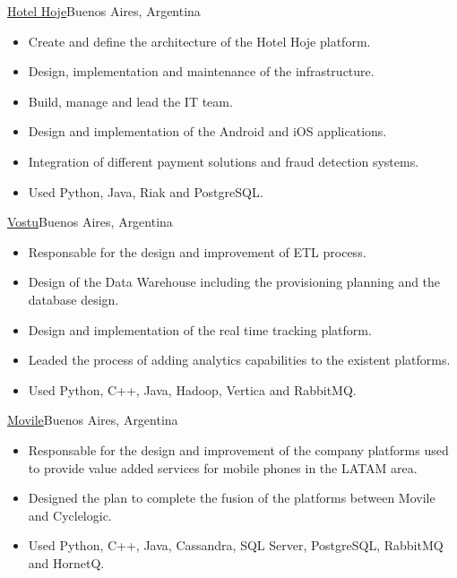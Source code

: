 \documentclass[a4paper,11pt]{moderncv}
\newcommand\weblink[2] {{\color{href} \href{#1}{#2}}}
\begin{document}
%
{\weblink{http://www.hotelhoje.com}{Hotel Hoje}}{Buenos Aires, Argentina}{}{%
\begin{itemize}
  \item Create and define the architecture of the Hotel Hoje platform.
  \item Design, implementation and maintenance of the infrastructure.
  \item Build, manage and lead the IT team.
  \item Design and implementation of the Android and iOS applications.
  \item Integration of different payment solutions and fraud detection 
    systems.
  \item Used Python, Java, Riak and PostgreSQL.
\end{itemize}
}
%
{\weblink{http://www.vostu.com}{Vostu}}{Buenos Aires, Argentina}{}{%
\begin{itemize}
  \item Responsable for the design and improvement of ETL process.
  \item Design of the Data Warehouse including the provisioning planning and
  the database design.
  \item Design and implementation of the real time tracking platform.
  \item Leaded the process of adding analytics capabilities to the existent
  platforms.
  \item Used Python, C++, Java, Hadoop, Vertica and RabbitMQ.
\end{itemize}
}
%
{\weblink{https://www.movile.com}{Movile}}{Buenos Aires, Argentina}{}{%
\begin{itemize}
  \item Responsable for the design and improvement of the company platforms
  used to provide value added services for mobile phones in the LATAM area.
  \item Designed the plan to complete the fusion of the platforms between
  Movile and Cyclelogic.
  \item Used Python, C++, Java, Cassandra, SQL Server, PostgreSQL, RabbitMQ and
  HornetQ.
\end{itemize}
}
%
\end{document}
